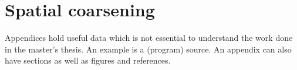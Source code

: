 \chapter{Spatial coarsening}
\label{app: spatial coarsening}
Appendices hold useful data which is not essential to understand the work
done in the master's thesis. An example is a (program) source.
An appendix can also have sections as well as figures and references\cite{h2g2}.


